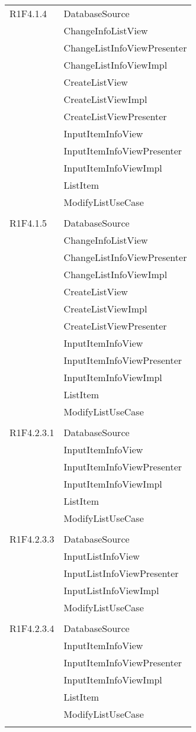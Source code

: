 \begin{center}
\begin{longtable}{|p{7cm}|p{7cm}|}
		R1F4.1.4 & DatabaseSource \\ & ChangeInfoListView \\ & ChangeListInfoViewPresenter \\ & ChangeListInfoViewImpl \\ & CreateListView \\ & CreateListViewImpl \\ & CreateListViewPresenter \\ & InputItemInfoView \\ & InputItemInfoViewPresenter \\ & InputItemInfoViewImpl \\ & ListItem \\ & ModifyListUseCase \\ & \\ \hline
		R1F4.1.5 & DatabaseSource \\ & ChangeInfoListView \\ & ChangeListInfoViewPresenter \\ & ChangeListInfoViewImpl \\ & CreateListView \\ & CreateListViewImpl \\ & CreateListViewPresenter \\ & InputItemInfoView \\ & InputItemInfoViewPresenter \\ & InputItemInfoViewImpl \\ & ListItem \\ & ModifyListUseCase \\ & \\ \hline
		R1F4.2.3.1 & DatabaseSource \\ & InputItemInfoView \\ & InputItemInfoViewPresenter \\ & InputItemInfoViewImpl \\ & ListItem \\ & ModifyListUseCase \\ & \\ \hline
		R1F4.2.3.3 & DatabaseSource \\ & InputListInfoView \\ & InputListInfoViewPresenter \\ & InputListInfoViewImpl \\ & ModifyListUseCase \\ & \\ \hline
		R1F4.2.3.4 & DatabaseSource \\ & InputItemInfoView \\ & InputItemInfoViewPresenter \\ & InputItemInfoViewImpl \\ & ListItem \\ & ModifyListUseCase \\ & \\ \hline

\end{longtable}
\end{center}
